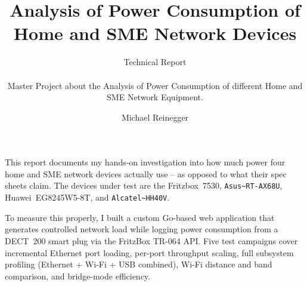 \documentclass[a4paper,oneside,10pt,ngerman,english]{scrartcl}
\begin{document}
\title{Analysis of Power Consumption of Home and SME Network Devices}



\subtitle{\texorpdfstring{Technical Report\\%
    \hfill\\%
    Master Project about the Analysis of Power Consumption of different Home and SME Network Equipment.
    \hfill\\%
}{Technical Report -- Master Project about the Analysis of Power Consumption of different Home and SME Network Equipment}}

\author{%
    Michael Reinegger
}









\maketitle


\cleardoubleoddpage
\setcounter{secnumdepth}{3}
\setcounter{tocdepth}{2}  %
\tableofcontents




\cleardoubleoddpage

This report documents my hands-on investigation into how much power four home and SME network devices actually use -- as opposed to what their spec sheets claim.
The devices under test are the Fritzbox~7530, \verb|Asus~RT-AX68U|, Huawei~EG8245W5-8T, and \verb|Alcatel~HH40V|.

To measure this properly, I built a custom Go-based web application that generates controlled network load while logging power consumption from a DECT~200 smart plug via the FritzBox TR-064 API.
Five test campaigns cover incremental Ethernet port loading, per-port throughput scaling, full subsystem profiling (Ethernet + Wi-Fi + USB combined), Wi-Fi distance and band comparison, and bridge-mode efficiency.
\end{document}
